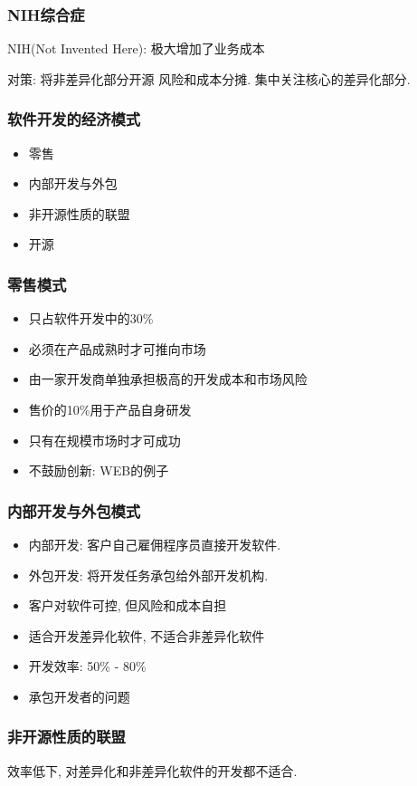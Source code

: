 \documentclass{beamer}
\begin{document}
\begin{frame}
	\frametitle{NIH综合症}
	NIH(Not Invented Here): 极大增加了业务成本 \\
	\begin{block}{对策: 将非差异化部分开源}
		风险和成本分摊. 集中关注核心的差异化部分.
	\end{block}
\end{frame}

\begin{frame}
	\frametitle{软件开发的经济模式}
\begin{itemize}
	\item 零售
	\item 内部开发与外包
	\item 非开源性质的联盟
	\item 开源
\end{itemize}
\end{frame}

\begin{frame}
	\frametitle{零售模式}
	\begin{itemize}
		\item 只占软件开发中的30\%
		\item 必须在产品成熟时才可推向市场
		\item 由一家开发商单独承担极高的开发成本和市场风险
		\item 售价的10\%用于产品自身研发
		\item 只有在规模市场时才可成功
		\item 不鼓励创新: WEB的例子
	\end{itemize}
\end{frame}


\begin{frame}
	\frametitle{内部开发与外包模式}
	\begin{itemize}
		\item 内部开发: 客户自己雇佣程序员直接开发软件. 
		\item 外包开发: 将开发任务承包给外部开发机构.
		\item 客户对软件可控, 但风险和成本自担
		\item 适合开发差异化软件, 不适合非差异化软件
		\item 开发效率: 50\% - 80\% 
		\item 承包开发者的问题
	\end{itemize}
\end{frame}

\begin{frame}
	\frametitle{ 非开源性质的联盟 }

	效率低下, 对差异化和非差异化软件的开发都不适合.
	
\end{frame}
\end{document}
